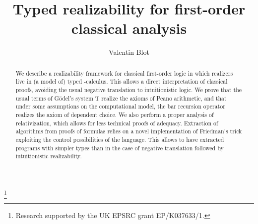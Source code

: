 \documentclass{CSML}
\begin{document}
\title{Typed realizability for first-order classical analysis}
\author{Valentin Blot}
\address{Department of Computer Science, University of Bath, United Kingdom}
\thanks{Research supported by the UK EPSRC grant EP/K037633/1.}
\begin{abstract}
We describe a realizability framework for classical first-order logic in which realizers live in (a model of) typed -calculus. This allows a direct interpretation of classical proofs, avoiding the usual negative translation to intuitionistic logic. We prove that the usual terms of G\"odel's system T realize the axioms of Peano arithmetic, and that under some assumptions on the computational model, the bar recursion operator realizes the axiom of dependent choice. We also perform a proper analysis of relativization, which allows for less technical proofs of adequacy. Extraction of algorithms from proofs of  formulas relies on a novel implementation of Friedman's trick exploiting the control possibilities of the language. This allows to have extracted programs with simpler types than in the case of negative translation followed by intuitionistic realizability.
\end{abstract}
\maketitle
\end{document}
